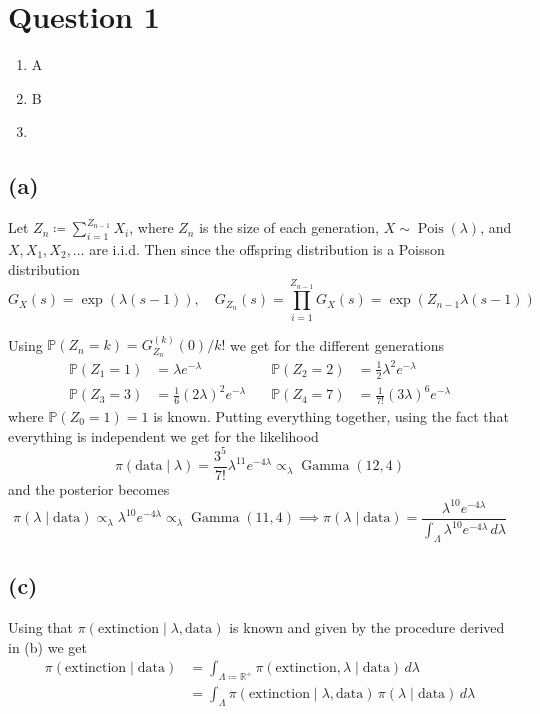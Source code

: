 \documentclass{article}
\DeclareMathOperator\Poisson{Pois}
\DeclareMathOperator\GammaDist{Gamma}
\begin{document}
\section{Question 1}
\begin{enumerate}[label=(\alph*)]
\item A
\item B
\item
\end{enumerate}

\subsection{(a)}
Let $Z_n \coloneqq \sum_{i=1}^{Z_{n-1}} X_i$,
where $Z_n$ is the size of each generation,
$X \sim \Poisson(\lambda)$, and $X, X_1, X_2, \ldots$ are i.i.d.
Then since the offspring distribution is a Poisson distribution
$$ G_X(s) = \exp(\lambda (s - 1)), \quad
G_{Z_n}(s) = \prod_{i=1}^{Z_{n-1}} G_X(s) = \exp(Z_{n-1} \lambda (s - 1)) $$

Using $ \mathbb P(Z_n = k) = G_{Z_n}^{(k)}(0) / k! $
we get for the different generations
\begin{align*}
	\mathbb P(Z_1 = 1) &= \lambda e^{-\lambda} &\quad
	\mathbb P(Z_2 = 2) &= \frac12 \lambda^2 e^{-\lambda} \\
	\mathbb P(Z_3 = 3) &= \frac16 (2\lambda)^2 e^{-\lambda} &\quad
	\mathbb P(Z_4 = 7) &= \frac1{7!} (3\lambda)^6 e^{-\lambda}
\end{align*}
where $\mathbb P(Z_0 = 1) = 1$ is known.
Putting everything together,
using the fact that everything is independent we get for the likelihood
$$ \pi(\text{data} \mid \lambda) = \frac{3^5}{7!} \lambda^{11} e^{-4\lambda}
	\propto_\lambda \GammaDist(12, 4) $$
and the posterior becomes
$$ \pi(\lambda \mid \text{data}) \propto_\lambda \lambda^{10} e^{-4\lambda}
	\propto_\lambda \GammaDist(11, 4)
	\implies \pi(\lambda \mid \text{data}) = \frac{\lambda^{10} e^{-4\lambda}}{\int_\Lambda \lambda^10 e^{-4\lambda} \, d\lambda} $$

\subsection{(c)}
Using that $\pi(\text{extinction} \mid \lambda, \text{data})$ is known
and given by the procedure derived in (b) we get
\begin{align*}
\pi(\text{extinction} \mid \text{data}) &= \int_{\Lambda \coloneqq \mathbb R^+} \pi(\text{extinction}, \lambda \mid \text{data}) \, d\lambda \\
	&= \int_\Lambda \pi(\text{extinction} \mid \lambda, \text{data}) \, \pi(\lambda \mid \text{data}) \, d\lambda
\end{align*}
\end{document}
